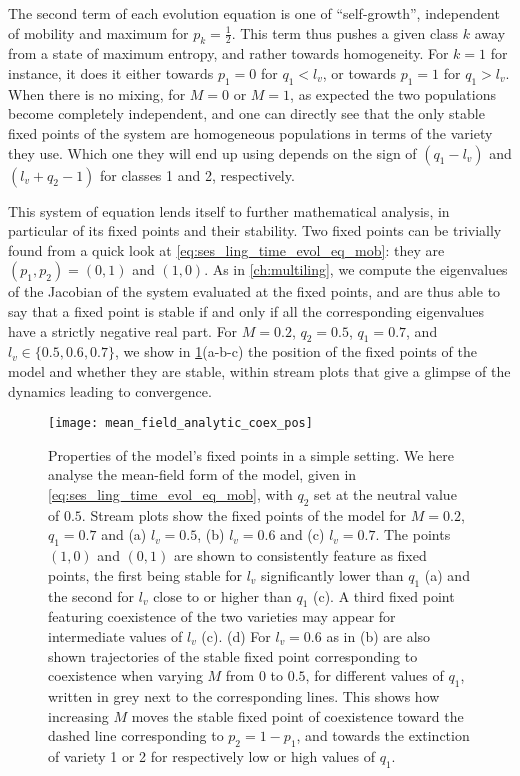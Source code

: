 \documentclass[../thesis.tex]{subfiles}
\begin{document}
The second term of each evolution equation is one of ``self-growth'', independent of
mobility and maximum for $p_k = \frac{1}{2}$. This term thus pushes a given class $k$
away from a state of maximum entropy, and rather towards homogeneity. For $k = 1$ for
instance, it does it either towards $p_1 = 0$ for $q_1 < l_v$, or towards $p_1 = 1$ for
$q_1 > l_v$. When there is no mixing, for $M = 0$ or $M = 1$, as expected the two
populations become completely independent, and one can directly see that the only stable
fixed points of the system are homogeneous populations in terms of the variety they use.
Which one they will end up using depends on the sign of $(q_1 - l_v)$ and $(l_v + q_2 -
1)$ for classes 1 and 2, respectively.

This system of equation lends itself to further mathematical analysis, in particular of its
fixed points and their stability. Two fixed points can be trivially found from a quick
look at \cref{eq:ses_ling_time_evol_eq_mob}: they are $(p_1, p_2) = (0, 1)$ and $(1,
0)$. As in \cref{ch:multiling}, we compute the eigenvalues of the Jacobian of the system
evaluated at the fixed points, and are thus able to say that a fixed point is stable if
and only if all the corresponding eigenvalues have a strictly negative real part. For $M
= 0.2$, $q_2= 0.5$, $q_1 = 0.7$, and $l_v \in \{ 0.5, 0.6, 0.7\}$, we show in
\cref{fig:mean_field_analytic_coex_pos}(a-b-c) the position of the fixed points of the
model and whether they are stable, within stream plots that give a glimpse of the
dynamics leading to convergence.
\begin{figure}
\centering
  \texttt{[image: mean\_field\_analytic\_coex\_pos]}
  \caption{Properties of the model's fixed points in a simple setting. We here analyse
  the mean-field form of the model, given in \cref{eq:ses_ling_time_evol_eq_mob}, with
  $q_2$ set at the neutral value of $0.5$. Stream plots show the fixed points of the
  model for $M = 0.2$, $q_1 = 0.7$ and (a) $l_v = 0.5$, (b) $l_v = 0.6$ and (c) $l_v =
  0.7$. The points $(1, 0)$ and $(0, 1)$ are shown to consistently feature as fixed
  points, the first being stable for $l_v$ significantly lower than $q_1$ (a) and the
  second for $l_v$ close to or higher than $q_1$ (c). A third fixed point featuring
  coexistence of the two varieties may appear for intermediate values of $l_v$ (c). (d)
  For $l_v = 0.6$ as in (b) are also shown trajectories of the stable fixed point
  corresponding to coexistence when varying $M$ from $0$ to $0.5$, for different values
  of $q_1$, written in grey next to the corresponding lines. This shows how increasing
  $M$ moves the stable fixed point of coexistence toward the dashed line corresponding
  to $p_2 = 1 - p_1$, and towards the extinction of variety 1 or 2 for respectively low
  or high values of $q_1$.}
  \label{fig:mean_field_analytic_coex_pos}
\end{figure}
\end{document}
